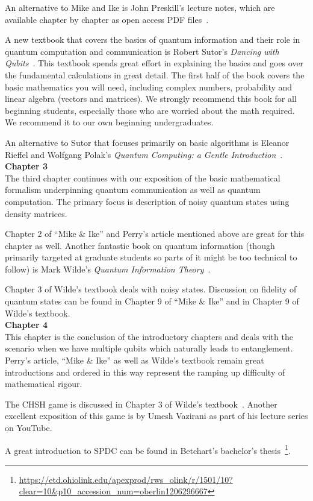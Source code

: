 An alternative to Mike and Ike is John Preskill's lecture notes, which are available chapter by chapter as open access PDF files~\cite{preskill:PH-CS219}.

A new textbook that covers the basics of quantum information and their role in quantum computation and communication is Robert Sutor's \emph{Dancing with Qubits}~\cite{sutor19:dancing}. This textbook spends great effort in explaining the basics and goes over the fundamental calculations in great detail. The first half of the book covers the basic mathematics you will need, including complex numbers, probability and linear algebra (vectors and matrices). We strongly recommend this book for all beginning students, especially those who are worried about the math required. We recommend it to our own beginning undergraduates.

An alternative to Sutor that focuses primarily on basic algorithms is Eleanor Rieffel and Wolfgang Polak's \emph{Quantum Computing: a Gentle Introduction}~\cite{rieffel2011quantum}.\\

\textbf{Chapter 3}\\

The third chapter continues with our exposition of the basic mathematical formalism underpinning quantum communication as well as quantum computation. The primary focus is description of noisy quantum states using density matrices.

Chapter 2 of “Mike \& Ike” and Perry’s article mentioned above are great for this chapter as well. Another fantastic book on quantum information (though primarily targeted at graduate students so parts of it might be too technical to follow) is Mark Wilde's \emph{Quantum Information Theory}~\cite{wilde2013quantum}.

Chapter 3 of Wilde’s textbook deals with noisy states. Discussion on fidelity of quantum states can be found in Chapter 9 of “Mike \& Ike” and in Chapter 9 of Wilde’s textbook.\\

\textbf{Chapter 4}\\

This chapter is the conclusion of the introductory chapters and deals with the scenario when we have multiple qubits which naturally leads to entanglement. Perry’s article, “Mike \& Ike” as well as Wilde’s textbook remain great introductions and ordered in this way represent the ramping up difficulty of mathematical rigour. 

The CHSH game is discussed in Chapter 3 of Wilde’s textbook~\cite{wilde2013quantum}. Another excellent exposition of this game is by Umesh Vazirani as part of his lecture series on YouTube.

A great introduction to SPDC can be found in Betchart’s bachelor's thesis~\footnote{\url{https://etd.ohiolink.edu/apexprod/rws_olink/r/1501/10?clear=10&p10_accession_num=oberlin1206296667}}.


